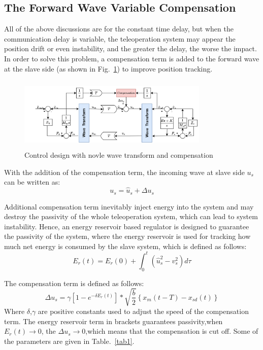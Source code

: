 \subsection{The Forward Wave Variable Compensation}
All of the above discussions are for the constant time delay,
but when the communication delay is variable,
the teleoperation system may appear the position drift or even instability,
and the greater the delay, the worse the impact. In order to solve this problem,
a compensation term is added to the forward wave at the slave side  (as shown in Fig.~\ref{fig6})
to improve position tracking\cite{b16}.
\begin{figure}[htbp]
    \centerline{\includegraphics[height=3.5cm,width=9.1cm]{with compensation.jpg}}
    \caption{Control design with novle wave transform and compensation}
    \label{fig6}
\end{figure}
\par With the addition of the compensation term,
the incoming wave at slave side $u_s$ can be written as:
\begin{equation}
    {{u}_{s}}={{\hat{u}}_{s}}+\Delta {{u}_{s}}\label{eq18}
\end{equation}
\par Additional compensation term inevitably inject energy into the system
and may destroy the passivity of the whole teleoperation system,
which can lead to system instability.
Hence, an energy reservoir based regulator is designed
to guarantee the passivity of the system,
where the energy reservoir is used for tracking how much net energy is consumed by the slave system,
which is defined as follows:
\begin{equation}
    {{E}_{r}}(t)={{E}_{r}}(0)+\int_{0}^{t}{(\hat{u}_{s}^{2}-v_{s}^{2})}d\tau\label{eq19}
\end{equation}
\par The compensation term is defined as follows:
\begin{equation}
    \Delta {{u}_{s}}=\gamma \left[ 1-{{e}^{-\delta {{E}_{r}}(t)}}
    \right]*\sqrt{\frac{b}{2}}\left\{ {{x}_{m}}(t-T)-{{x}_{sd}}(t) \right\}\label{eq20}
\end{equation}
Where $\delta$,$\gamma$ are positive constants used to adjust the speed of the compensation term.
The energy reservoir term in brackets guarantees passivity,when $E_r(t) \rightarrow 0$,
the $\Delta u_s \rightarrow 0$,which means that the compensation is cut off.
Some of the parameters are given in Table.~\ref{tab1}.

